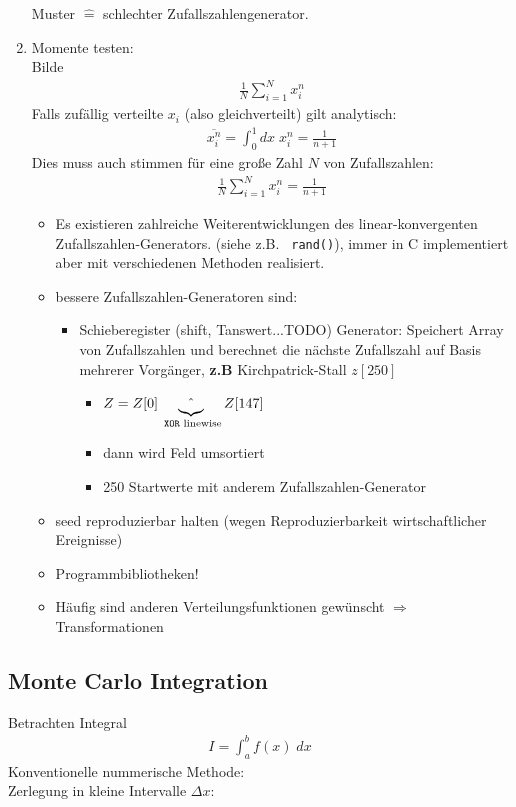 \documentclass[12pt]{article}
\begin{document}
\begin{enumerate}
Muster $\widehat{=}$ schlechter Zufallszahlengenerator. 

\item Momente testen: \\
Bilde \begin{align}
\frac{1}{N} \sum_{i=1}^N x_i^n
\end{align}
Falls zufällig verteilte $x_i$ (also gleichverteilt) gilt analytisch: \begin{align}
\overline{x_i^n} = \int _0 ^1 dx \; x_i^n = \frac{1}{n+1}
\end{align}
Dies muss auch stimmen für eine große Zahl $N$ von Zufallszahlen:
\begin{align}
\frac{1}{N} \sum_{i=1}^N x_i^n = \frac{1}{n+1}
\end{align}
\begin{itemize}
\item Es existieren zahlreiche Weiterentwicklungen des linear-konvergenten Zufallszahlen-Generators. (siehe z.B. \texttt{ rand()}), immer in C implementiert aber mit verschiedenen Methoden realisiert. 
\item bessere Zufallszahlen-Generatoren sind:
\begin{itemize}
\item Schieberegister (shift, Tanswert...TODO) Generator: Speichert Array von Zufallszahlen und berechnet die nächste Zufallszahl auf Basis mehrerer Vorgänger, \textbf{z.B} Kirchpatrick-Stall %
$z[250]$ \begin{itemize}
\item $Z= Z[0] \underbrace{ \string^ }_\text{ \texttt{XOR} linewise} Z[147]$
\item dann wird Feld umsortiert
\item 250 Startwerte mit anderem Zufallszahlen-Generator %
\end{itemize}
\end{itemize}
\item seed reproduzierbar halten (wegen Reproduzierbarkeit wirtschaftlicher Ereignisse)
\item Programmbibliotheken!
\item Häufig sind anderen Verteilungsfunktionen gewünscht $\Rightarrow $ Transformationen
\end{itemize}

\end{enumerate}


\subsection{ Monte Carlo Integration}
Betrachten Integral 
\begin{align}
I= \int_a^b f(x) \; dx
\end{align}
Konventionelle nummerische Methode: \\
Zerlegung in kleine Intervalle $\Delta x$:
\end{document}
